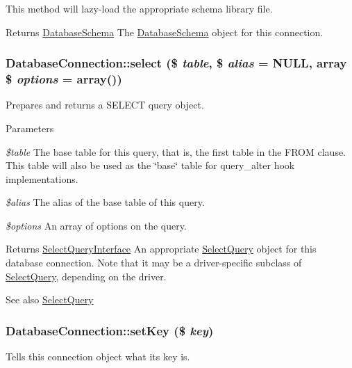 This method will lazy-\/load the appropriate schema library file.

\begin{DoxyReturn}{Returns}
\hyperlink{classDatabaseSchema}{DatabaseSchema} The \hyperlink{classDatabaseSchema}{DatabaseSchema} object for this connection. 
\end{DoxyReturn}
\hypertarget{classDatabaseConnection_a31f271cf685087c1a45a0cf74bb2b73e}{
\subsubsection[{select}]{\setlength{\rightskip}{0pt plus 5cm}DatabaseConnection::select (\$ {\em table}, \/  \$ {\em alias} = {\ttfamily NULL}, \/  array \$ {\em options} = {\ttfamily array()})}}
\label{classDatabaseConnection_a31f271cf685087c1a45a0cf74bb2b73e}
Prepares and returns a SELECT query object.


\begin{DoxyParams}{Parameters}
\item[{\em \$table}]The base table for this query, that is, the first table in the FROM clause. This table will also be used as the \char`\"{}base\char`\"{} table for query\_\-alter hook implementations. \item[{\em \$alias}]The alias of the base table of this query. \item[{\em \$options}]An array of options on the query.\end{DoxyParams}
\begin{DoxyReturn}{Returns}
\hyperlink{interfaceSelectQueryInterface}{SelectQueryInterface} An appropriate \hyperlink{classSelectQuery}{SelectQuery} object for this database connection. Note that it may be a driver-\/specific subclass of \hyperlink{classSelectQuery}{SelectQuery}, depending on the driver.
\end{DoxyReturn}
\begin{DoxySeeAlso}{See also}
\hyperlink{classSelectQuery}{SelectQuery} 
\end{DoxySeeAlso}
\hypertarget{classDatabaseConnection_a057f1bce0514e0ce1a555bee7e61930b}{
\subsubsection[{setKey}]{\setlength{\rightskip}{0pt plus 5cm}DatabaseConnection::setKey (\$ {\em key})}}
\label{classDatabaseConnection_a057f1bce0514e0ce1a555bee7e61930b}
Tells this connection object what its key is.


